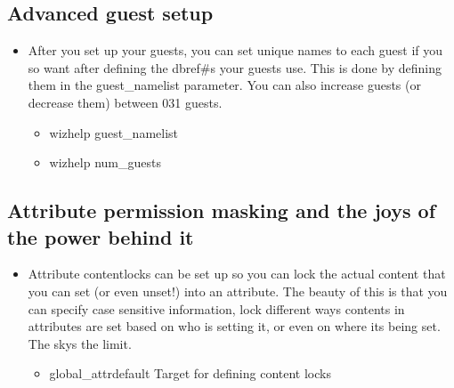 \documentclass[letterpaper,10pt,english]{sphinxmanual}
\begin{document}
\subsection{Advanced guest setup}
\label{\detokenize{features:advanced-guest-setup}}\begin{itemize}
\item {} 
\sphinxAtStartPar
After you set up your guests, you can set unique names to each guest
if you so want after defining the dbref\#\textquotesingle{}s your guests use.  This is
done by defining them in the guest\_namelist parameter.  You can also
increase guests (or decrease them) between 0\sphinxhyphen{}31 guests.
\begin{itemize}
\item {} 
\sphinxAtStartPar
wizhelp guest\_namelist

\item {} 
\sphinxAtStartPar
wizhelp num\_guests

\end{itemize}

\end{itemize}


\subsection{Attribute permission masking and the joys of the power behind it}
\label{\detokenize{features:attribute-permission-masking-and-the-joys-of-the-power-behind-it}}\begin{itemize}
\item {} 
\sphinxAtStartPar
Attribute contentlocks can be set up so you can lock the actual
content that you can set (or even unset!) into an attribute.
The beauty of this is that you can specify case sensitive
information, lock different ways contents in attributes are set
based on who is setting it, or even on where it\textquotesingle{}s being set.
The sky\textquotesingle{}s the limit.
\begin{itemize}
\item {} 
\sphinxAtStartPar
global\_attrdefault    \sphinxhyphen{} Target for defining content locks

\end{itemize}

\end{itemize}
\end{document}
